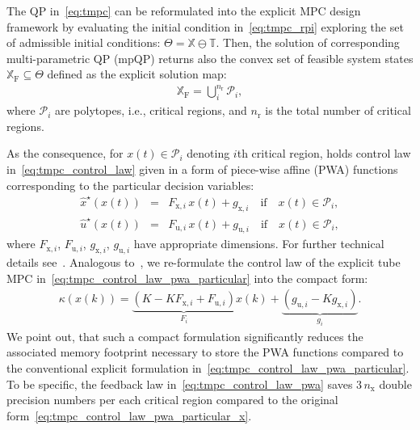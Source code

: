 \documentclass[letterpaper, 10 pt, conference]{ieeeconf}
\begin{document}
	The QP in~\eqref{eq:tmpc} can be reformulated into the explicit MPC design framework by evaluating the initial condition in~\eqref{eq:tmpc_rpi} exploring the set of admissible initial conditions: $\Theta = \mathbb{X} \ominus \mathbb{T}$. Then, the solution of corresponding multi-parametric QP (mpQP) returns also the convex set of feasible system states $\mathbb{X}_{\mathrm{F}} \subseteq \Theta$ defined as the explicit solution map:
	\begin{eqnarray}
		\label{eq:tmpc_partition}
		\mathbb{X}_{\mathrm{F}} = \bigcup_{i}^{n_{\mathrm{r}}} \mathcal{P}_{i} ,
	\end{eqnarray}
	where $\mathcal{P}_{i}$ are polytopes, i.e., critical regions, and $n_{\mathrm{r}}$ is the total number of critical regions.
	
	As the consequence, for $x(t) \in \mathcal{P}_{i}$ denoting $i$th critical region, holds control law in~\eqref{eq:tmpc_control_law} given in a form of
	piece-wise affine (PWA) functions corresponding to the particular decision variables:
	\begin{subequations}
		\label{eq:tmpc_control_law_pwa_particular}
		\begin{eqnarray}
			\label{eq:tmpc_control_law_pwa_particular_x}
			\hat{x}^{\star}(x(t)) \!\!\!\!&=&\!\!\!\! F_{\mathrm{x},i} \, x(t) + g_{\mathrm{x},i} \quad \text{if} \quad x(t) \in \mathcal{P}_{i}, \\
			\label{eq:tmpc_control_law_pwa_particular_u}
			\hat{u}^{\star}(x(t)) \!\!\!\!&=&\!\!\!\! F_{\mathrm{u},i} \, x(t) + g_{\mathrm{u},i} \quad \text{if} \quad x(t) \in \mathcal{P}_{i},
		\end{eqnarray}
	\end{subequations}
	where $F_{\mathrm{x},i}$, $F_{\mathrm{u},i}$, $g_{\mathrm{x},i}$, $g_{\mathrm{u},i}$ have appropriate dimensions. For further technical details see~\cite{BM02}. 
	Analogous to~\cite{ZT14}, we re-formulate the control law of the explicit tube MPC in~\eqref{eq:tmpc_control_law_pwa_particular} into the compact form:
	\begin{eqnarray}
		\label{eq:tmpc_control_law_pwa}
		\kappa(x(k)) = \underbrace{ \left( K - K F_{\mathrm{x},i} + F_{\mathrm{u},i} \right) }_{ F_{i} } x(k) + \underbrace{ \left( g_{\mathrm{u},i} - K g_{\mathrm{x},i} \right) }_{ g_{i} }.
	\end{eqnarray}
	We point out, that such a compact formulation significantly reduces the associated memory footprint necessary to store the PWA functions compared to the conventional explicit formulation in~\eqref{eq:tmpc_control_law_pwa_particular}.  
	To be specific, the feedback law in~\eqref{eq:tmpc_control_law_pwa} saves $3\,n_\text{x}$ double precision numbers per each critical region compared to the original form~\eqref{eq:tmpc_control_law_pwa_particular_x}.
	
\end{document}
